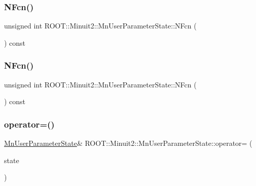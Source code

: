 \subsubsection{\texorpdfstring{NFcn()}{NFcn()}\hspace{0.1cm}{\footnotesize\ttfamily [2/3]}}
{\footnotesize\ttfamily unsigned int R\+O\+O\+T\+::\+Minuit2\+::\+Mn\+User\+Parameter\+State\+::\+N\+Fcn (\begin{DoxyParamCaption}{ }\end{DoxyParamCaption}) const\hspace{0.3cm}{\ttfamily [inline]}}

\mbox{\label{classROOT_1_1Minuit2_1_1MnUserParameterState_a21fb0f06261f9bed8359263a99f7d5ca}} 
\subsubsection{\texorpdfstring{NFcn()}{NFcn()}\hspace{0.1cm}{\footnotesize\ttfamily [3/3]}}
{\footnotesize\ttfamily unsigned int R\+O\+O\+T\+::\+Minuit2\+::\+Mn\+User\+Parameter\+State\+::\+N\+Fcn (\begin{DoxyParamCaption}{ }\end{DoxyParamCaption}) const\hspace{0.3cm}{\ttfamily [inline]}}

\mbox{\label{classROOT_1_1Minuit2_1_1MnUserParameterState_af46ca603e05f41605057359254f02470}} 
\subsubsection{\texorpdfstring{operator=()}{operator=()}\hspace{0.1cm}{\footnotesize\ttfamily [1/3]}}
{\footnotesize\ttfamily \mbox{\hyperlink{classROOT_1_1Minuit2_1_1MnUserParameterState}{Mn\+User\+Parameter\+State}}\& R\+O\+O\+T\+::\+Minuit2\+::\+Mn\+User\+Parameter\+State\+::operator= (\begin{DoxyParamCaption}\item[{const \mbox{\hyperlink{classROOT_1_1Minuit2_1_1MnUserParameterState}{Mn\+User\+Parameter\+State}} \&}]{state }\end{DoxyParamCaption})\hspace{0.3cm}{\ttfamily [inline]}}

